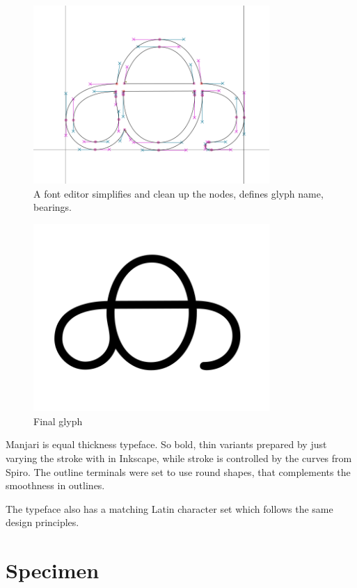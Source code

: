 \documentclass[11pt,twoside,a4paper,parskip=full]{scrartcl}
\begin{document}
\begin{figure}[h!]
	\includegraphics[width=0.8\textwidth]{images/design-3-cubic-bezier-in-font-editor.png}
	\caption{A font editor simplifies and clean up the nodes, defines glyph name, bearings.}
	\label{design-3}
\end{figure}

\begin{figure}[h!]
	\includegraphics[width=0.8\textwidth]{images/design-4-final.png}
	\caption{Final glyph}
	\label{design-4}
\end{figure}

Manjari is equal thickness typeface. So bold, thin variants prepared by just varying the stroke with in Inkscape, while stroke is controlled by the curves from Spiro. The outline terminals were set to use round shapes, that complements the smoothness in outlines.

The typeface also has a matching Latin character set which follows the same design principles.
\clearpage
\section{Specimen}
\end{document}
